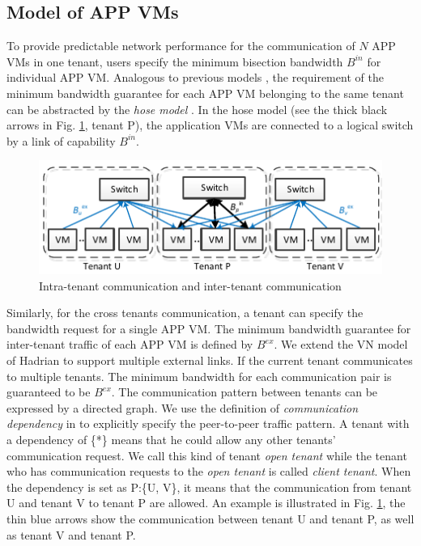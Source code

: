 \documentclass[review]{elsarticle}
\begin{document}
\subsection{Model of APP VMs}
To provide predictable network performance for the communication of $N$ APP VMs in one tenant, users %
specify the minimum bisection bandwidth $B^{in}$ for individual APP VM. Analogous to previous models \cite{B13cta, P12fst}, the requirement of the minimum bandwidth guarantee for each APP VM belonging to the same tenant can be abstracted by the \emph{hose model} \cite{hose_model}. In the hose model (see the thick black arrows in Fig. \ref{fig:hose}, tenant P), the application VMs are connected to a logical switch by a link of capability $B^{in}$.

\begin{figure}
	\centering
		\includegraphics[width=4.5 in]{fig/tagmodel.pdf}
	\caption{Intra-tenant communication and inter-tenant communication}
	\label{fig:hose}
\end{figure}

Similarly, for the cross tenants communication, a tenant can specify the bandwidth request for a single APP VM. The minimum bandwidth guarantee for inter-tenant traffic of each APP VM is defined by $B^{ex}$. We extend the VN model of Hadrian \cite{B13cta} to support multiple external links. If the current tenant communicates to multiple tenants. The minimum bandwidth for each communication pair is guaranteed to be $B^{ex}$. The communication pattern between tenants can be expressed by a directed graph. We use the definition of \emph{communication dependency} in \cite{B13cta} to explicitly specify the peer-to-peer traffic pattern. A tenant with a dependency of \{*\} means that he could allow any other tenants' communication request. We call this kind of tenant \emph{open tenant} while the tenant who has communication requests to the \emph{open tenant} is called \emph{client tenant}. When the dependency is set as P:\{U, V\}, it means that the communication from tenant U and tenant V to tenant P are allowed. An example is illustrated in Fig. \ref{fig:hose}, the thin blue arrows show the communication between tenant U and tenant P, as well as tenant V and tenant P.
\end{document}
